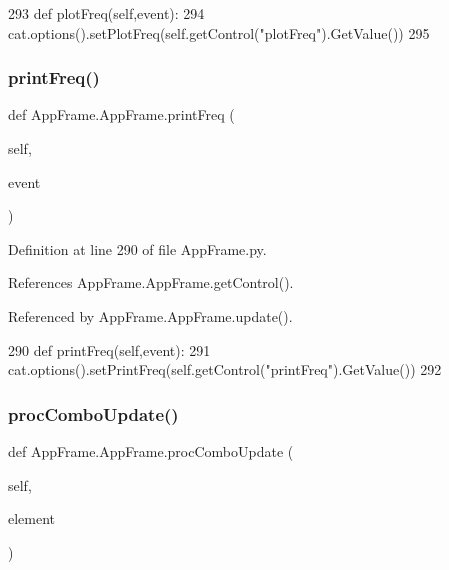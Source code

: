 \begin{DoxyCode}
293     \textcolor{keyword}{def }plotFreq(self,event):
294         cat.options().setPlotFreq(self.getControl(\textcolor{stringliteral}{"plotFreq"}).GetValue()) 
295 
\end{DoxyCode}
\mbox{\label{classAppFrame_1_1AppFrame_a0d84b5e77982e10cf04c5c01b89f2f79}} 
\subsubsection{\texorpdfstring{print\+Freq()}{printFreq()}}
{\footnotesize\ttfamily def App\+Frame.\+App\+Frame.\+print\+Freq (\begin{DoxyParamCaption}\item[{}]{self,  }\item[{}]{event }\end{DoxyParamCaption})}



Definition at line 290 of file App\+Frame.\+py.



References App\+Frame.\+App\+Frame.\+get\+Control().



Referenced by App\+Frame.\+App\+Frame.\+update().


\begin{DoxyCode}
290     \textcolor{keyword}{def }printFreq(self,event):
291         cat.options().setPrintFreq(self.getControl(\textcolor{stringliteral}{"printFreq"}).GetValue()) 
292 
\end{DoxyCode}
\mbox{\label{classAppFrame_1_1AppFrame_a5fdf323f27c204af88e0ecea1c1f0660}} 
\subsubsection{\texorpdfstring{proc\+Combo\+Update()}{procComboUpdate()}}
{\footnotesize\ttfamily def App\+Frame.\+App\+Frame.\+proc\+Combo\+Update (\begin{DoxyParamCaption}\item[{}]{self,  }\item[{}]{element }\end{DoxyParamCaption})}



